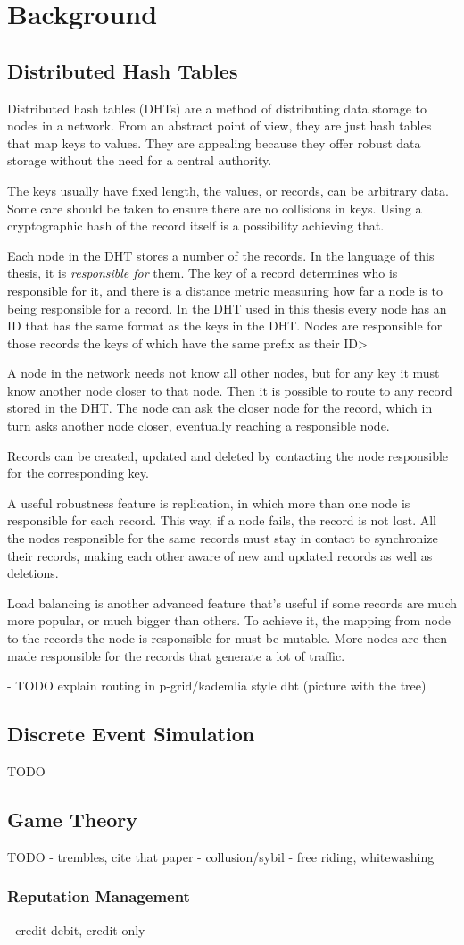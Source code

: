\chapter{Background}
\label{chap:background}
\section{Distributed Hash Tables}
Distributed hash tables (DHTs) are a method of distributing data storage to
nodes in a network. From an abstract point of view, they are just hash tables
that map keys to values. They are appealing because they offer robust data
storage without the need for a central authority.

The keys usually have fixed length, the values, or records, can be arbitrary
data. Some care should be taken to ensure there are no collisions in keys. Using
a cryptographic hash of the record itself is a possibility achieving that.

Each node in the DHT stores a number of the records. In the language of this
thesis, it is \emph{responsible for} them. The key of a record determines who is
responsible for it, and there is a distance metric measuring how far a node is
to being responsible for a record. In the DHT used in this thesis every node has
an ID that has the same format as the keys in the DHT. Nodes are responsible for
those records the keys of which have the same prefix as their ID>

A node in the network needs not know all other nodes, but for any key it must
know another node closer to that node. Then it is possible to route to any
record stored in the DHT. The node can ask the closer node for the record, which
in turn asks another node closer, eventually reaching a responsible node.

Records can be created, updated and deleted by contacting the node responsible
for the corresponding key.

A useful robustness feature is replication, in which more than one node is
responsible for each record. This way, if a node fails, the record is not lost.
All the nodes responsible for the same records must stay in contact to
synchronize their records, making each other aware of new and updated records as
well as deletions.

Load balancing is another advanced feature that's useful if some records are
much more popular, or much bigger than others. To achieve it, the mapping from
node to the records the node is responsible for must be mutable. More nodes are
then made responsible for the records that generate a lot of traffic.

- TODO explain routing in p-grid/kademlia style dht (picture with the tree)

\section{Discrete Event Simulation}
TODO

\section{Game Theory}
TODO
- trembles, cite that paper
- collusion/sybil
- free riding, whitewashing
\subsection{Reputation Management}
- credit-debit, credit-only
